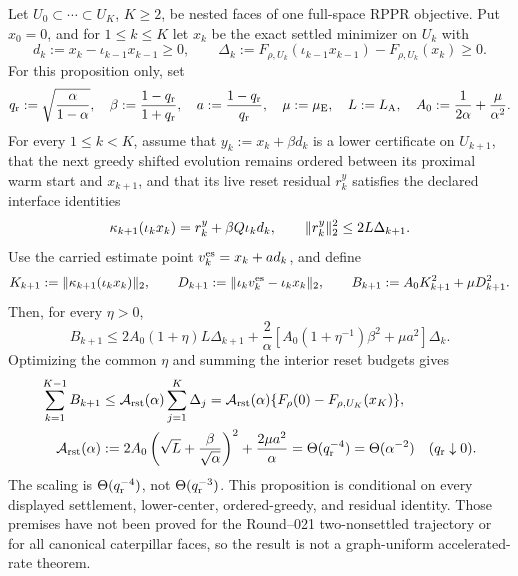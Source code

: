 \begin{proposition}
\label{prop:conditional-nested-reset-budget-telescope}
Let $U_0\subset\cdots\subset U_K$, $K\geq2$, be nested faces of one
full-space RPPR objective.  Put $x_0=0$, and for $1\leq k\leq K$ let $x_k$
be the exact settled minimizer on $U_k$ with
\begin{equation}
 d_k:=x_k-\iota_{k-1}x_{k-1}\geq0,
 \qquad
 \Delta_k:=F_{\rho,U_k}(\iota_{k-1}x_{k-1})
             -F_{\rho,U_k}(x_k)\geq0.
 \label{eq:conditional-reset-face-drops}
\end{equation}
For this proposition only, set
\begin{equation}
 q_{\rm r}:=\sqrt{\frac{\alpha}{1-\alpha}},\quad
 \beta:=\frac{1-q_{\rm r}}{1+q_{\rm r}},\quad
 a:=\frac{1-q_{\rm r}}{q_{\rm r}},\quad
 \mu:=\mu_{\rm E},\quad L:=L_{\rm A},\quad
 A_0:=\frac1{2\alpha}+\frac{\mu}{\alpha^2}.
 \label{eq:conditional-reset-parameters}
\end{equation}
For every $1\leq k<K$, assume that
$y_k:=x_k+\beta d_k$ is a lower certificate on $U_{k+1}$, that the next
greedy shifted evolution remains ordered between its proximal warm start and
$x_{k+1}$, and that its live reset residual $r_k^y$ satisfies the declared
interface identities
\begin{equation}
 \kappa_{k+1}(\iota_kx_k)=r_k^y+\beta Q\iota_kd_k,\qquad
 \lVert r_k^y\rVert_2^2\leq2L\Delta_{k+1}.
 \label{eq:conditional-reset-interface}
\end{equation}
Use the carried estimate point
$v_k^{\rm es}=x_k+a d_k$, and define
\begin{equation*}
 K_{k+1}:=\lVert\kappa_{k+1}(\iota_kx_k)\rVert_2,\qquad
 D_{k+1}:=\lVert\iota_kv_k^{\rm es}-\iota_kx_k\rVert_2,\qquad
 B_{k+1}:=A_0K_{k+1}^2+\mu D_{k+1}^2.
\end{equation*}
Then, for every $\eta>0$,
\begin{equation}
 B_{k+1}\leq
 2A_0(1+\eta)L\Delta_{k+1}
 +\frac2\alpha\left[
  A_0(1+\eta^{-1})\beta^2+\mu a^2\right]\Delta_k.
 \label{eq:conditional-reset-local-bound}
\end{equation}
Optimizing the common $\eta$ and summing the interior reset budgets gives
\begin{align}
 \sum_{k=1}^{K-1}B_{k+1}
 &\leq \mathcal A_{\rm rst}(\alpha)
       \sum_{j=1}^{K}\Delta_j
 =\mathcal A_{\rm rst}(\alpha)
   \{F_\rho(0)-F_{\rho,U_K}(x_K)\},
 \notag\\
 \mathcal A_{\rm rst}(\alpha)
 &:=2A_0\left(\sqrt L+\frac\beta{\sqrt\alpha}\right)^2
   +\frac{2\mu a^2}{\alpha}
 =\Theta(q_{\rm r}^{-4})=\Theta(\alpha^{-2})
 \quad(q_{\rm r}\downarrow0).
 \label{eq:conditional-reset-global-telescope}
\end{align}
The scaling is $\Theta(q_{\rm r}^{-4})$, not
$\Theta(q_{\rm r}^{-3})$.  This proposition is conditional on every displayed
settlement, lower-center, ordered-greedy, and residual identity.  Those
premises have not been proved for the Round--021 two-nonsettled trajectory or
for all canonical caterpillar faces, so the result is not a graph-uniform
accelerated-rate theorem.
\end{proposition}

